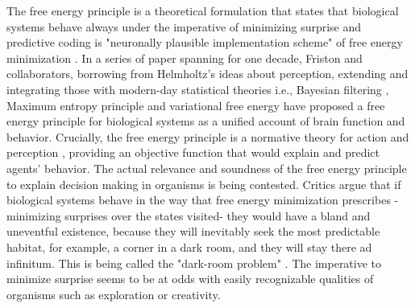 \documentclass[11pt, onecolumn]{article}
\begin{document}
The free energy principle is a theoretical formulation that states that biological systems behave always under the imperative of minimizing surprise and predictive coding is "neuronally plausible implementation scheme" of free energy minimization \citep{schwartenbeck_exploration_2013}. In a series of paper spanning for one decade, Friston and collaborators, borrowing from Helmholtz’s ideas about perception, extending and integrating those with modern-day statistical theories i.e., Bayesian filtering \citep{friston_theory_2005}, Maximum entropy principle \citep{Jaynes:2003} and variational free energy \citep{Hinton-Camp:1993} have proposed a free energy principle for biological systems as a unified account of brain function and behavior.
Crucially, the free energy principle is a normative theory for action and perception \citep{schwartenbeck_exploration_2013}, providing an objective function that would explain and predict agents' behavior. 
The actual relevance and soundness of the free energy principle to explain decision making in organisms is being contested. Critics argue that if biological systems behave in the way that free energy minimization prescribes -minimizing surprises over the states visited- they would have a bland and uneventful existence, because they will inevitably seek the most predictable habitat, for example, a corner in a dark room, and they will stay there ad infinitum. This is being called the "dark-room problem" \citep{friston_free-energy_2012}. The imperative to minimize surprise seems to be at odds with easily recognizable qualities of organisms such as exploration or creativity.
\end{document}
